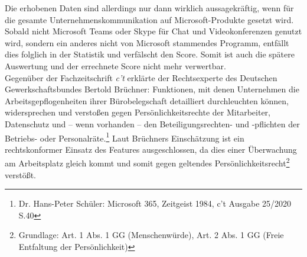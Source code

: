 Die erhobenen Daten sind allerdings nur dann wirklich aussagekräftig, wenn für die gesamte Unternehmenskommunikation auf Microsoft-Produkte gesetzt wird. Sobald nicht Microsoft Teams oder Skype für Chat und Videokonferenzen genutzt wird, sondern ein anderes nicht von Microsoft stammendes Programm, entfällt dies folglich in der Statistik und verfälscht den Score. Somit ist auch die spätere Auswertung und der errechnete Score nicht mehr verwertbar.\\

Gegenüber der Fachzeitschrift \textit{c't} erklärte der Rechtsexperte des Deutschen Gewerkschaftsbundes Bertold Brüchner: \glqq Funktionen, mit denen Unternehmen die Arbeitsgepflogenheiten ihrer Bürobelegschaft detailliert durchleuchten können, widersprechen und verstoßen gegen Persönlichkeitsrechte der Mitarbeiter, Datenschutz und – wenn vorhanden – den Beteiligungsrechten- und -pflichten der Betriebs- oder Personalräte.\grqq{}\footnote{Dr. Hans-Peter Schüler: \glqq Microsoft 365, Zeitgeist 1984\grqq{}, c't Ausgabe 25/2020 S.40} Laut Brüchners Einschätzung ist ein rechtskonformer Einsatz des Features ausgeschlossen, da dies einer Überwachung am Arbeitsplatz gleich kommt und somit gegen geltendes Persönlichkeitsrecht\footnote{Grundlage: Art. 1 Abs. 1 GG (Menschenwürde), Art. 2 Abs. 1 GG (Freie Entfaltung der Persönlichkeit)} verstößt.\\

\vfill